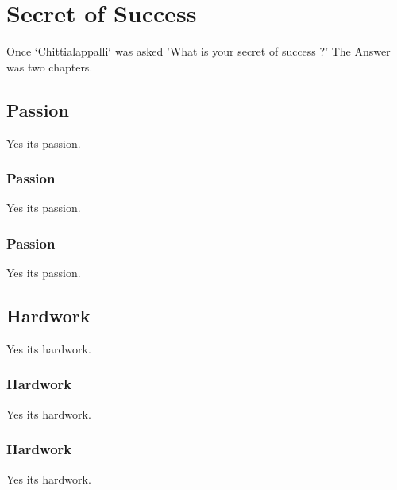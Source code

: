 \documentclass{article}
\begin{document}
\section{Secret of Success}

Once `Chittialappalli` was asked 'What is your secret of success ?'
The Answer was two chapters.

\subsection{Passion}

Yes its passion.

\subsubsection{Passion}

Yes its passion.

\subsubsection{Passion}

Yes its passion.

\subsection{Hardwork}

Yes its hardwork.

\subsubsection{Hardwork}

Yes its hardwork.

\subsubsection{Hardwork}

Yes its hardwork.
\end{document}
